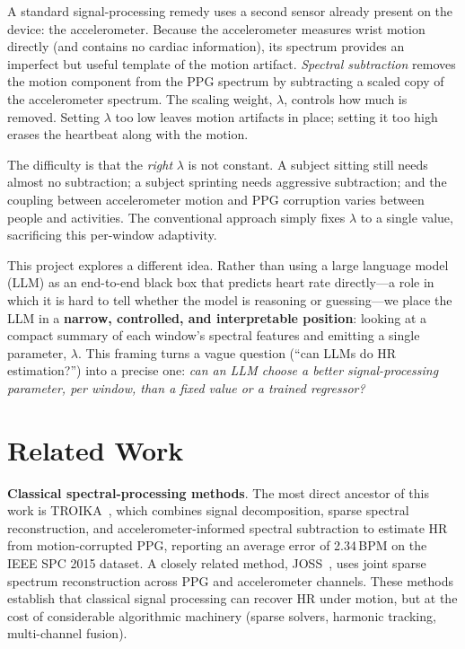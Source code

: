 \documentclass[sigconf,nonacm,11pt]{acmart}
\begin{document}
A standard signal-processing remedy uses a second sensor already present on the device: the accelerometer. Because the accelerometer measures wrist motion directly (and contains no cardiac information), its spectrum provides an imperfect but useful template of the motion artifact. \emph{Spectral subtraction} removes the motion component from the PPG spectrum by subtracting a scaled copy of the accelerometer spectrum. The scaling weight, $\lambda$, controls how much is removed. Setting $\lambda$ too low leaves motion artifacts in place; setting it too high erases the heartbeat along with the motion.

The difficulty is that the \emph{right} $\lambda$ is not constant. A subject sitting still needs almost no subtraction; a subject sprinting needs aggressive subtraction; and the coupling between accelerometer motion and PPG corruption varies between people and activities. The conventional approach simply fixes $\lambda$ to a single value, sacrificing this per-window adaptivity.

This project explores a different idea. Rather than using a large language model (LLM) as an end-to-end black box that predicts heart rate directly---a role in which it is hard to tell whether the model is reasoning or guessing---we place the LLM in a \textbf{narrow, controlled, and interpretable position}: looking at a compact summary of each window's spectral features and emitting a single parameter, $\lambda$. This framing turns a vague question (``can LLMs do HR estimation?'') into a precise one: \emph{can an LLM choose a better signal-processing parameter, per window, than a fixed value or a trained regressor?}

\section{Related Work}

\textbf{Classical spectral-processing methods}. The most direct ancestor of this work is TROIKA~\cite{TROIKA}, which combines signal decomposition, sparse spectral reconstruction, and accelerometer-informed spectral subtraction to estimate HR from motion-corrupted PPG, reporting an average error of 2.34\,BPM on the IEEE SPC 2015 dataset. A closely related method, JOSS~\cite{JOSS}, uses joint sparse spectrum reconstruction across PPG and accelerometer channels. These methods establish that classical signal processing can recover HR under motion, but at the cost of considerable algorithmic machinery (sparse solvers, harmonic tracking, multi-channel fusion).
\end{document}
